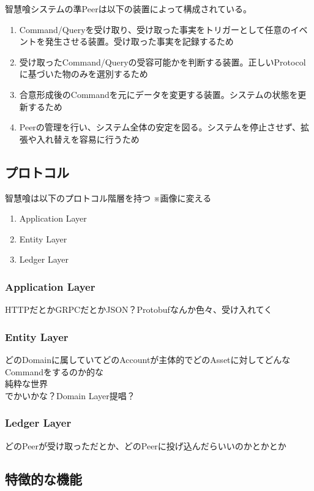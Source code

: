 \documentclass[10pt,a4paper]{jarticle}
\begin{document}
\begin{multicols}{2}
智慧喰システムの準Peerは以下の装置によって構成されている。
\begin{enumerate}
  \item Command/Queryを受け取り、受け取った事実をトリガーとして任意のイベントを発生させる装置。受け取った事実を記録するため
  \item 受け取ったCommand/Queryの受容可能かを判断する装置。正しいProtocolに基づいた物のみを選別するため
  \item 合意形成後のCommandを元にデータを変更する装置。システムの状態を更新するため
  \item Peerの管理を行い、システム全体の安定を図る。システムを停止させず、拡張や入れ替えを容易に行うため  
\end{enumerate}

\subsection{プロトコル}
智慧喰は以下のプロトコル階層を持つ
※画像に変える
\begin{enumerate}
  \item Application Layer
  \item Entity Layer
  \item Ledger Layer
\end{enumerate}

\subsubsection{Application Layer}
HTTPだとかGRPCだとかJSON？Protobufなんか色々、受け入れてく

\subsubsection{Entity Layer}
どのDomainに属していてどのAccountが主体的でどのAssetに対してどんなCommandをするのか的な\\
純粋な世界\\
でかいかな？Domain Layer提唱？

\subsubsection{Ledger Layer}
どのPeerが受け取っただとか、どのPeerに投げ込んだらいいのかとかとか

\subsection{特徴的な機能}


\end{multicols}
\end{document}
